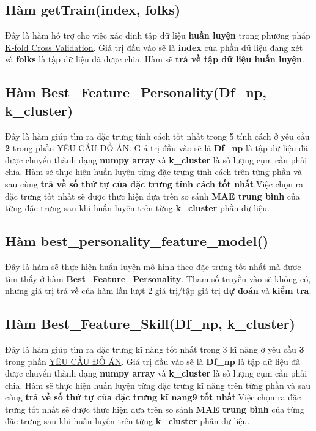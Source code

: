 \documentclass{report}
\begin{document}
\subsection{Hàm getTrain(index, folks)}\label{sec:getTrain}
    Đây là hàm hỗ trợ cho việc xác định tập dữ liệu \textbf{huấn luyện} trong phương pháp \hyperref[sec:k-fold-cross-validation]{\underline{K-fold Cross Validation}}. Giá trị đầu vào sẽ là \textbf{index} của phần dữ liệu đang xét và \textbf{folks} là tập dữ liệu đã được chia. Hàm sẽ \textbf{trả về tập dữ liệu huấn luyện}.

\subsection{Hàm Best\_Feature\_Personality(Df\_np, k\_cluster)}
    Đây là hàm giúp tìm ra đặc trưng tính cách tốt nhất trong 5 tính cách ở yêu cầu \textbf{2} trong phần \hyperref[sec:requirement]{\underline{YÊU CẦU ĐỒ ÁN}}. Giá trị đầu vào sẽ là \textbf{Df\_np} là tập dữ liệu đã được chuyển thành dạng \textbf{numpy array} và \textbf{k\_cluster} là số lượng cụm cần phải chia. Hàm sẽ thực hiện huấn luyện từng đặc trưng tính cách trên từng phần và sau cùng \textbf{trả về số thứ tự của đặc trưng tính cách tốt nhất}.Việc chọn ra đặc trưng tốt nhất sẽ được thực hiện dựa trên so sánh \textbf{MAE trung bình} của từng đặc trưng sau khi huấn luyện trên từng \textbf{k\_cluster} phần dữ liệu.

\subsection{Hàm best\_personality\_feature\_model()}\label{sec:bestpersonalityfeaturemodel}
    Đây là hàm sẽ thực hiện huấn luyện mô hình theo đặc trưng tốt nhất mà được tìm thấy ở hàm \textbf{Best\_Feature\_Personality}. Tham số truyền vào sẽ không có, nhưng giá trị trả về của hàm lần lượt 2 giá trị/tập giá trị \textbf{dự đoán} và \textbf{kiểm tra}.

\subsection{Hàm Best\_Feature\_Skill(Df\_np, k\_cluster)}\label{sec:BestFeatureSkill}
    Đây là hàm giúp tìm ra đặc trưng kĩ năng tốt nhất trong 3 kĩ năng ở yêu cầu \textbf{3} trong phần \hyperref[sec:requirement]{\underline{YÊU CẦU ĐỒ ÁN}}. Giá trị đầu vào sẽ là \textbf{Df\_np} là tập dữ liệu đã được chuyển thành dạng \textbf{numpy array} và \textbf{k\_cluster} là số lượng cụm cần phải chia. Hàm sẽ thực hiện huấn luyện từng đặc trưng kĩ năng trên từng phần và sau cùng \textbf{trả về số thứ tự của đặc trưng kĩ nang9 tốt nhất}.Việc chọn ra đặc trưng tốt nhất sẽ được thực hiện dựa trên so sánh \textbf{MAE trung bình} của từng đặc trưng sau khi huấn luyện trên từng \textbf{k\_cluster} phần dữ liệu.
\end{document}
